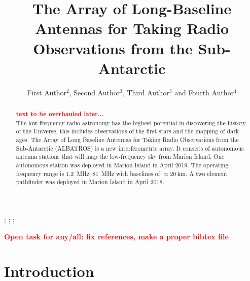 \documentclass{ws-jai}
\newcommand{\attention}[1]{\textcolor{red}{\bf {#1}}}
\begin{document}
\catchline{}{}{}{}{} %


\title{The Array of Long-Baseline Antennas for Taking Radio
  Observations from the Sub-Antarctic}

\author{First Author$^{2}$, Second Author$^{3}$, Third Author$^{3}$ and Fourth Author$^{4}$}

\address{
$^{2}$Department, University Name, City, State ZIP/Zone, Country, fauthor@university.com\\
$^{3}$Group, Company, Address, City, State ZIP/Zone, Country\\
$^{4}$Group, Company, Address, City, State ZIP/Zone, Country, fauthor@company.com
}

\maketitle


\begin{history}
;
;
;
\end{history}

\begin{abstract}
\attention {text to be overhauled later...} \\
The low frequency radio astronomy has the highest potential in
discovering the history of the Universe, this includes observations
of the first stars and the mapping of dark ages. The Array of Long
Baseline Antennas for Taking Radio Observations from the
Sub-Antarctic (ALBATROS) is a new interferometric array. It consists
of autonomous antenna stations that will map the low-frequency sky
from Marion Island. One autonomous station was deployed in Marion
Island in April 2019. The operating frequency range is
\SIrange{1.2}{81}{\MHz} with baselines of $\approx \SI{20}{\km}$. A
two element pathfinder was deployed in Marion Island in April
2018.
\end{abstract}


\attention{Open task for any/all: fix references, make a proper bibtex file}

\section{Introduction}
\end{document}
